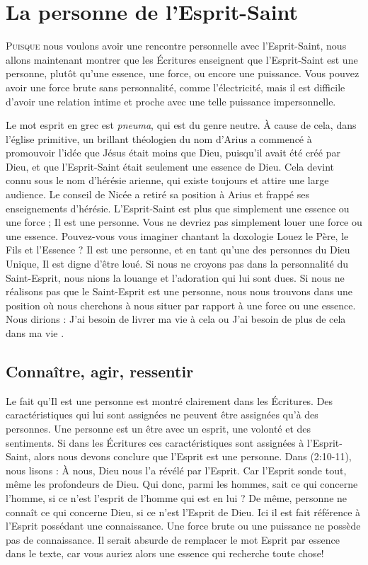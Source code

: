 \chapter{La personne de l'Esprit-Saint}

\lettrine[lines=3]{P}{uisque} nous voulons avoir une rencontre personnelle avec l'Esprit-Saint, nous allons maintenant montrer que les Écritures enseignent que l'Esprit-Saint est une personne, plutôt qu'une essence, une force, ou encore une puissance. Vous pouvez avoir une force brute sans personnalité, comme l'électricité, mais il est difficile d'avoir une relation intime et proche avec une telle puissance impersonnelle.

Le mot \og esprit \fg{} en grec est \emph{pneuma}, qui est du genre neutre. À cause de cela, dans l'église primitive, un brillant théologien du nom d'Arius a commencé à promouvoir l'idée que Jésus était moins que Dieu, puisqu'il avait été créé par Dieu, et que l'Esprit-Saint était seulement une \og essence \fg{} de Dieu. Cela devint connu sous le nom d'hérésie arienne, qui existe toujours et attire une large audience. Le conseil de Nicée a retiré sa position à Arius et frappé ses enseignements d'hérésie. L'Esprit-Saint est plus que simplement une essence ou une force ; Il est une personne. Vous ne devriez pas simplement louer une force ou une essence. Pouvez-vous vous imaginer chantant la doxologie \og Louez le Père, le Fils et l'Essence \fg{} ? Il est une personne, et en tant qu'une des personnes du Dieu Unique, Il est digne d'être loué. Si nous ne croyons pas dans la personnalité du Saint-Esprit, nous nions la louange et l'adoration qui lui sont dues. Si nous ne réalisons pas que le Saint-Esprit est une personne, nous nous trouvons dans une position où nous cherchons à nous situer par rapport à une force ou une essence. Nous dirions : \og J'ai besoin de livrer ma vie à cela \fg{} ou \og J'ai besoin de plus de cela dans ma vie .\fg


\section{Connaître, agir, ressentir}

Le fait qu'Il est une personne est montré clairement dans les Écritures. Des caractéristiques qui lui sont assignées ne peuvent être assignées qu'à des personnes. Une personne est un être avec un esprit, une volonté et des sentiments. Si dans les Écritures ces caractéristiques sont assignées à l'Esprit-Saint, alors nous devons conclure que l'Esprit est une personne. Dans (2:10-11), nous lisons : \og À nous, Dieu nous l'a révélé par l'Esprit. Car l'Esprit sonde tout, même les profondeurs de Dieu. Qui donc, parmi les hommes, sait ce qui concerne l'homme, si ce n'est l'esprit de l'homme qui est en lui ? De même, personne ne connaît ce qui concerne Dieu, si ce n'est l'Esprit de Dieu. \fg{} Ici il est fait référence à l'Esprit possédant une connaissance. Une force brute ou une puissance ne possède pas de connaissance. Il serait absurde de remplacer le mot \og Esprit \fg{} par \og essence \fg{} dans le texte, car vous auriez alors une \og essence \fg{} qui recherche toute chose!

